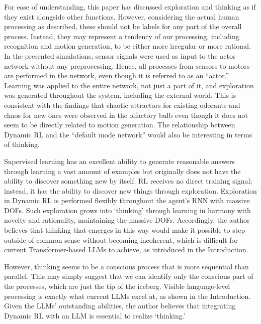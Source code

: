 For ease of understanding, this paper has discussed exploration and thinking
as if they exist alongside other functions.
However, considering the actual human processing as described,
these should not be labels for any part of the overall process.
Instead, they may represent a tendency of our processing,
including recognition and motion generation, to be either more irregular or more rational.
In the presented simulations, sensor signals were used as input to the actor network without any preprocessing.
Hence, all processes from sensors to motors are performed in the network,
even though it is referred to as an ``actor.''
Learning was applied to the entire network, not just a part of it,
and exploration was generated throughout the system, including the external world.
This is consistent with the findings that chaotic attractors for existing odorants and chaos for new ones were observed
in the olfactory bulb \citep{Skarda, Freeman} even though it does not seem to be directly related to motion generation.
The relationship between Dynamic RL and the ``default mode network'' \citep{DMN} would also be interesting
in terms of thinking.

Supervised learning has an excellent ability to generate reasonable answers
through learning a vast amount of examples but originally does not have the ability to discover something new by itself.
RL receives no direct training signal; instead, it has the ability to discover new things through exploration.
Exploration in Dynamic RL is performed flexibly throughout the agent's RNN with massive DOFs.
Such exploration grows into `thinking' through learning in harmony with novelty and rationality, maintaining the massive DOFs.
Accordingly, the author believes that thinking that emerges in this way would make it possible to step outside of common sense
without becoming incoherent, which is difficult for current Transformer-based LLMs to achieve,
as introduced in the Introduction.

However, thinking seems to be a conscious process that is more sequential than parallel.
This may simply suggest that we can identify only the conscious part of the processes, which are just the tip of the iceberg.
Visible language-level processing is exactly what current LLMs excel at, as shown in the Introduction.
Given the LLMs' outstanding abilities, the author believes that integrating Dynamic RL with an LLM is essential to realize `thinking.'

